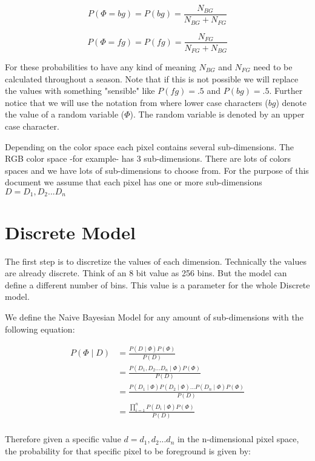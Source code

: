 \documentclass[a4paper,12pt]{report}
\begin{document}
\begin{equation}
P(\Phi= bg) = P(bg) = \frac{N_{BG}}{N_{BG}+N_{FG}}
\end{equation}

\begin{equation}
P(\Phi= fg) = P(fg) = \frac{N_{FG}}{N_{FG}+N_{BG}}
\end{equation}

For these probabilities to have any kind of meaning $N_{BG}$ and $N_{FG}$ need
to be calculated throughout a season. Note that if this is not possible we will
replace the values with something "sensible" like $P(fg)=.5$ and $P(bg)=.5$.
Further notice that we will use the notation from
 where
lower case characters ($bg$) denote the value of a random variable ($\Phi$).
The random variable is denoted by an upper case character.

Depending on the color space each pixel contains several sub-dimensions. The RGB
color space -for example- has 3 sub-dimensions. There are lots of colors spaces and we have
lots of sub-dimensions to choose from. For the purpose of this document we assume
that each pixel has one or more sub-dimensions $D={D_1, D_2... D_n}$

\section{Discrete Model}
The first step is to discretize the values of each dimension. Technically the
values are already discrete. Think of an 8 bit value as 256 bins. But the model
can define a different number of bins. This value is a parameter for the
whole Discrete model.

We define the Naive Bayesian Model for any amount of sub-dimensions with the
following equation:

\begin{align}
P(\Phi \mid D)
    &= \frac{P(D \mid \Phi) P(\Phi)}
            {P(D)} \\
    &= \frac{P(D_1, D_2...D_n \mid \Phi) P(\Phi)}
            {P(D)} \\
    &= \frac{P(D_1 \mid \Phi)
             P(D_2 \mid \Phi) ...
             P(D_n \mid \Phi) P(\Phi)}
            {P(D)} \\
    &= \frac{\prod_{i=1}^n{P(D_i \mid \Phi)} P(\Phi)}
            {P(D)} \\
\end{align}

Therefore given a specific value $d={d_1,d_2...d_n}$ in the n-dimensional
pixel space, the probability for that specific pixel to be foreground is
given by:
\end{document}
